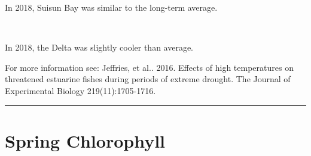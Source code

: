 \documentclass[
]{book}
\begin{document}
\begin{panel-grid}
\begin{columns-nocenter}
\begin{column40}
\end{column40}

\begin{column800}

In 2018, Suisun Bay was similar to the long-term average.

\end{column800}

\begin{column40}

~

\end{column40}

\begin{column800}

In 2018, the Delta was slightly cooler than average.

\end{column800}

\end{columns-nocenter}

\end{panel-grid}

\begin{disclaimer}
For more information see: Jeffries, et al.. 2016. Effects of high
temperatures on threatened estuarine fishes during periods of extreme
drought. The Journal of Experimental Biology 219(11):1705-1716.
\end{disclaimer}

\begin{center}\rule{0.5\linewidth}{0.5pt}\end{center}

\hypertarget{spring-chlorophyll}{%
\section{Spring Chlorophyll}\label{spring-chlorophyll}}
\end{document}
